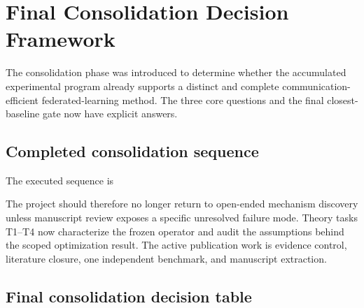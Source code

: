 \section{Final Consolidation Decision Framework}
\label{sec:final-consolidation-decision}

The consolidation phase was introduced to determine whether the accumulated experimental program already supports a distinct and complete communication-efficient federated-learning method. The three core questions and the final closest-baseline gate now have explicit answers.

\subsection{Completed consolidation sequence}

The executed sequence is
\begin{center}
\end{center}
The project should therefore no longer return to open-ended mechanism discovery unless manuscript review exposes a specific unresolved failure mode. Theory tasks T1--T4 now characterize the frozen operator and audit the assumptions behind the scoped optimization result. The active publication work is evidence control, literature closure, one independent benchmark, and manuscript extraction.

\subsection{Final consolidation decision table}

